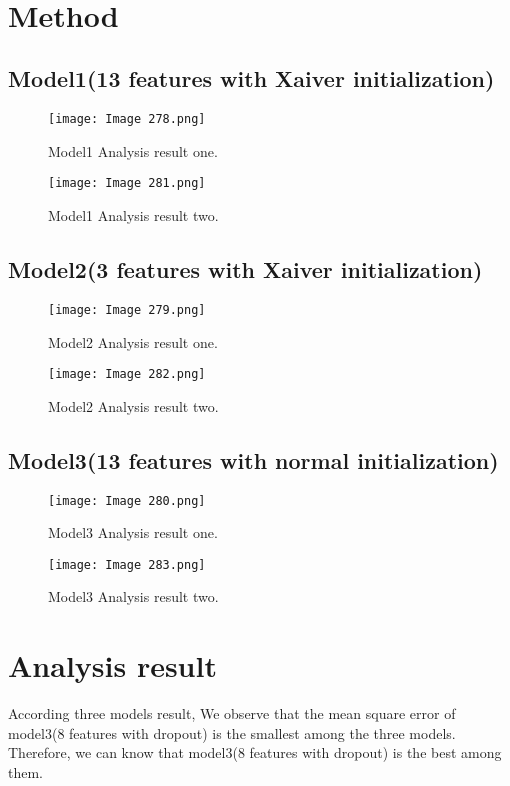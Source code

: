 \documentclass[conference]{IEEEtran}
\begin{document}
\\
\section{Method}




\subsection{Model1(13 features with Xaiver initialization)}

\begin{figure}[htbp][H]
\centerline{\texttt{[image: Image 278.png]}}
\caption{Model1 Analysis result one.}
\label{fig1}
\end{figure}



\begin{figure}[htbp][H]
\centerline{\texttt{[image: Image 281.png]}}
\caption{Model1 Analysis result two.}
\label{fig1}
\end{figure}



\subsection{Model2(3 features with Xaiver initialization)}

\begin{figure}[htbp][H]
\centerline{\texttt{[image: Image 279.png]}}
\caption{Model2 Analysis result one.}
\label{fig2}
\end{figure}


\begin{figure}[htbp][H]
\centerline{\texttt{[image: Image 282.png]}}
\caption{Model2 Analysis result two.}
\label{fig2}
\end{figure}



\subsection{Model3(13 features with normal
initialization)}

\begin{figure}[htbp][H]
\centerline{\texttt{[image: Image 280.png]}}
\caption{Model3 Analysis result one.}
\label{fig3}
\end{figure}




\begin{figure}[htbp][H]
\centerline{\texttt{[image: Image 283.png]}}
\caption{Model3 Analysis result two.}
\label{fig3}
\end{figure}




\section{Analysis result}

According three models result, We observe that the mean square error of model3(8 features with dropout) is  the smallest among the three models. Therefore, we can know that model3(8 features with dropout) is the best among them.
\end{document}
